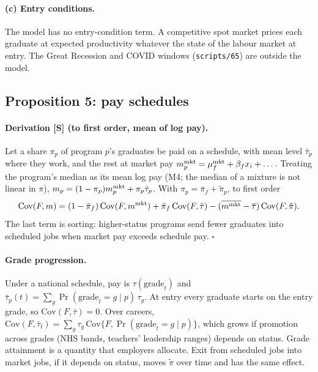 \paragraph{(c) Entry conditions.} The model has no entry-condition term. A competitive spot market prices each
graduate at expected productivity whatever the state of the labour market at entry. The Great Recession and COVID
windows (\texttt{scripts/65}) are outside the model.

\subsection{Proposition 5: pay schedules}\label{si:theory:schedules}

\paragraph{Derivation [S] (to first order, mean of log pay).} Let a share $\pi_p$ of program $p$'s graduates be
paid on a schedule, with mean level $\bar\tau_p$ where they work, and the rest at market pay
$m^{\rm mkt}_p=\mu^{\rm mkt}_f+\beta_fx_i+\dots$. Treating the program's median as its mean log pay (M4; the median
of a mixture is not linear in $\pi$), $m_p=(1-\pi_p)m^{\rm mkt}_p+\pi_p\bar\tau_p$. With
$\pi_p=\bar\pi_f+\tilde\pi_p$, to first order
\[
\mathrm{Cov}(F,m)=(1-\bar\pi_f)\,\mathrm{Cov}(F,m^{\rm mkt})+\bar\pi_f\,\mathrm{Cov}(F,\bar\tau)
-(\overline{m^{\rm mkt}}-\overline{\tau})\,\mathrm{Cov}(F,\tilde\pi) .
\]
The last term is sorting: higher-status programs send fewer graduates into scheduled jobs when market pay exceeds
schedule pay. $\square$

\paragraph{Grade progression.} Under a national schedule, pay is $\tau(\text{grade}_t)$ and
$\bar\tau_p(t)=\sum_g\Pr(\text{grade}_t=g\mid p)\,\tau_g$. At entry every graduate starts on the entry grade, so
$\mathrm{Cov}(F,\bar\tau)=0$. Over careers,
$\mathrm{Cov}(F,\bar\tau_t)=\sum_g\tau_g\,\mathrm{Cov}\{F,\Pr(\text{grade}_t=g\mid p)\}$, which grows if promotion
across grades (NHS bands, teachers' leadership ranges) depends on status. Grade attainment is a quantity that
employers allocate. Exit from scheduled jobs into market jobs, if it depends on status, moves $\tilde\pi$ over
time and has the same effect.

